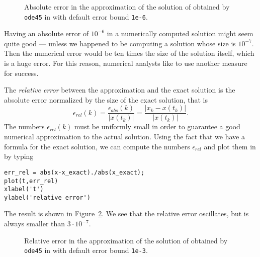 \documentclass{ximera}
\begin{document}
\begin{figure}[htb]
   \centerline{%
   }
   \caption{Absolute error in the approximation of the solution of
   \protect{} obtained by {\tt ode45} in \protect\Matlab with 
	default error bound {\tt 1e-6}.}
   \label{fig:ode45err0}
\end{figure}

Having an absolute error of $10^{-6}$ in a numerically computed solution might
seem quite good --- unless we happened to be computing a solution whose size 
is $10^{-7}$.  Then the numerical error would be ten times the size of the 
solution itself, which is a huge error.  For this reason, numerical analysts
like to use another measure for success.  

The {\em relative error\/} between 
the approximation and the exact solution is the absolute error normalized by 
the size of the exact solution, that is  
\[
\epsilon_{rel}(k) = \frac{\epsilon_{abs}(k)}{|x(t_k)|} 
= \frac{|x_k - x(t_k)|}{|x(t_k)|}.
\]
The numbers $\epsilon_{rel}(k)$ must be uniformly small in order to guarantee
a good numerical approximation to the actual solution.  Using the fact
that we have a formula for the exact solution, we can compute the numbers 
$\epsilon_{rel}$ and plot them in \Matlab by typing
\begin{verbatim}
err_rel = abs(x-x_exact)./abs(x_exact);
plot(t,err_rel)
xlabel('t')
ylabel('relative error')
\end{verbatim} 
The result is shown in Figure~\ref{fig:ode45err1}.  We see that the relative 
error oscillates, but is always smaller than $3\cdot 10^{-7}$.
\begin{figure}[htb]
   \centerline{%
   }
   \caption{Relative error in the approximation of the solution of
   \protect{} obtained by {\tt ode45} in \protect\Matlab with 
	default error bound {\tt 1e-3}.}
   \label{fig:ode45err1}
\end{figure}
\end{document}
